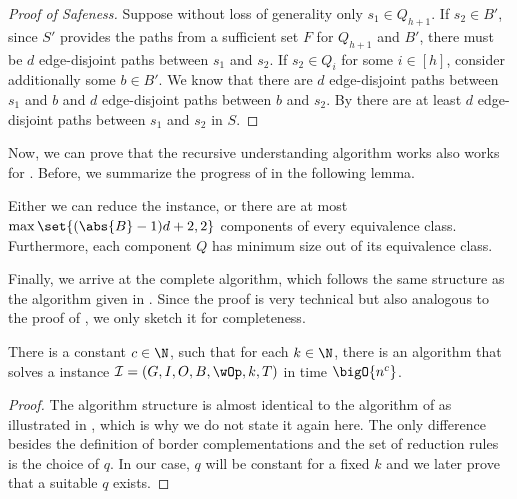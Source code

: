 \begin{lemma}
\begin{lemma}
\begin{lemma}
\begin{lemma}
\begin{lemma}
\begin{theorem}
\begin{reduction*}
\begin{lemma}
\begin{reduction*}
\begin{reduction*}
\begin{proof}[Proof of Safeness]
  Suppose without loss of generality only $s_1 \in Q_{h+1}$. If $s_2 \in B'$, since $S'$ provides the paths from a sufficient set $F$ for $Q_{h+1}$ and $B'$, there must be $d$ edge-disjoint paths between $s_1$ and $s_2$. If $s_2 \in Q_i$ for some $i \in [h]$, consider additionally some $b \in B'$. We know that there are $d$ edge-disjoint paths between $s_1$ and $b$ and $d$ edge-disjoint paths between $b$ and $s_2$. By  there are at least $d$ edge-disjoint paths between $s_1$ and $s_2$ in $S$.
\end{proof}
\fi

Now, we can prove that the recursive understanding algorithm works also works for \probborder{}. Before, we summarize the progress of  in the following lemma.
\begin{lemma}\label{lem:d_all_reductions}
  Either we can reduce the instance, or there are at most $\max\set{(\abs{B}-1)d + 2, 2}$ components of every equivalence class. Furthermore, each component $Q$ has minimum size out of its equivalence class.
\end{lemma}

Finally, we arrive at the complete algorithm, which follows the same structure as the algorithm given in . Since the proof is very technical but also analogous to the proof of , we only sketch it for completeness. 

\iflong
\begin{theorem}
\else
\begin{theorem}[$\star$]
\fi
\label{thm:border_d_edge_fpt}
  There is a constant $c \in \N$, such that for each $k \in \N$, there is an algorithm that solves a \probborder{} instance $\mathcal{I} = (G,I,O,B,\wOp,k,T)$ in time $\bigO{n^c}$.
\end{theorem}
\iflong
\begin{proof}
  The algorithm structure is almost identical to the algorithm of  as illustrated in , which is why we do not state it again here. The only difference besides the definition of border complementations and the set of reduction rules is the choice of $q$. In our case, $q$ will be constant for a fixed $k$ and we later prove that a suitable $q$ exists.


\end{proof}
\end{theorem}
\end{reduction*}
\end{reduction*}
\end{lemma}
\end{reduction*}
\end{theorem}
\end{lemma}
\end{lemma}
\end{lemma}
\end{lemma}
\end{lemma}
